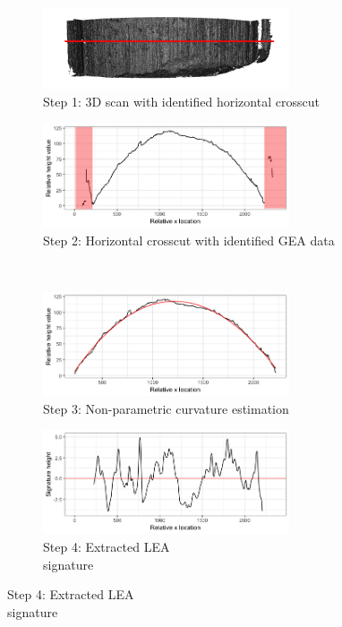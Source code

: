 \documentclass[varwidth]{standalone}
\begin{document}
 
\begin{figure}
  \begin{subfigure}[b]{6cm}
    \centering
    \includegraphics[width=0.8\textwidth]{../images/3d_plot_top_crosscut}
        \captionsetup{justification=centering}
    \caption*{Step 1: 3D scan with identified horizontal crosscut}

  \end{subfigure}
  \hfill
  \begin{subfigure}[b]{6cm}
    \centering
    \includegraphics[width=0.8\textwidth]{../images/profile_paper}
            \captionsetup{justification=centering}
    \caption*{Step 2: Horizontal crosscut with identified GEA data}
  \end{subfigure} \\
  
  \begin{subfigure}[b]{6cm}
    \centering
    \includegraphics[width=0.8\textwidth]{../images/profile_paper_loess}
            \captionsetup{justification=centering}
    \caption*{Step 3: Non-parametric curvature estimation}
  \end{subfigure}
 \hfill
  \begin{subfigure}[b]{6cm}
    \centering
    \includegraphics[width=0.8\textwidth]{../images/signature_paper}
            \captionsetup{justification=centering}
    \caption*{Step 4: Extracted LEA  \\  signature}
  \end{subfigure}
\end{figure}
 
\end{document}
